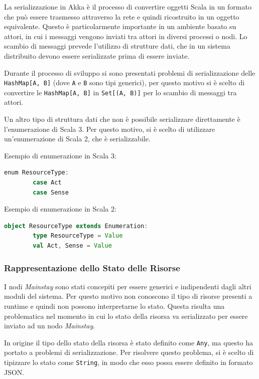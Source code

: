 \documentclass{scrartcl}
\begin{document}
La serializzazione in Akka è il processo di convertire oggetti Scala in un formato che può essere trasmesso attraverso la rete e quindi ricostruito in un oggetto equivalente. Questo è particolarmente importante in un ambiente basato su attori, in cui i messaggi vengono inviati tra attori in diversi processi o nodi. Lo scambio di messaggi prevede l'utilizzo di strutture dati, che in un sistema distribuito devono essere serializzate prima di essere inviate.

Durante il processo di sviluppo si sono presentati problemi di serializzazione delle \verb|HashMap[A, B]| (dove \verb|A| e \verb|B| sono tipi generici), per questo motivo si è scelto di convertire le \verb|HashMap[A, B]| in \verb|Set[(A, B)]| per lo scambio di messaggi tra attori.

Un altro tipo di struttura dati che non è possibile serializzare direttamente è l'enumerazione di Scala 3. Per questo motivo, si è scelto di utilizzare un'enumerazione di Scala 2, che è serializzabile.

Esempio di enumerazione in Scala 3:

\begin{lstlisting}[language=Scala]
    enum ResourceType:
        case Act
        case Sense
\end{lstlisting}

Esempio di enumerazione in Scala 2:

\begin{lstlisting}[language=Scala]
    object ResourceType extends Enumeration:
        type ResourceType = Value
        val Act, Sense = Value
\end{lstlisting}

\subsubsection{Rappresentazione dello Stato delle Risorse}

I nodi \textit{Mainstay} sono stati concepiti per essere generici e indipendenti dagli altri moduli del sistema. Per questo motivo non conoscono il tipo di risorse presenti a runtime e quindi non possono interpretarne lo stato. Questa risulta una problematica nel momento in cui lo stato della risorsa va serializzato per essere inviato ad un nodo \textit{Mainstay}.

In origine il tipo dello stato della risorsa è stato definito come \verb|Any|, ma questo ha portato a problemi di serializzazione. Per risolvere questo problema, si è scelto di tipizzare lo stato come \verb|String|, in modo che esso possa essere definito in formato JSON.
\end{document}

